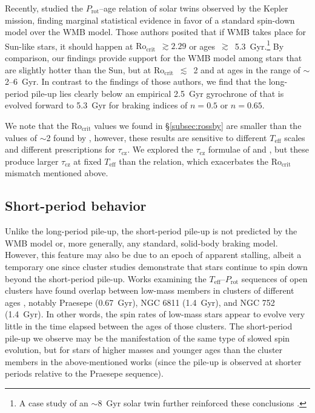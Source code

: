 \documentclass[trackchanges,twocolumn]{aastex631}
\newcommand{\taucz}{$\tau_\mathrm{cz}$\xspace}
\newcommand{\rocrit}{$\mathrm{Ro_{crit}}$\xspace}
\newcommand{\teff}{\ensuremath{T_{\mathrm{eff}}}\xspace}
\newcommand{\prot}{\ensuremath{P_\mathrm{rot}}\xspace}
\begin{document}
Recently, \citet{LorenzoOliveira2019} studied the \prot--age relation of solar twins observed by the Kepler mission, finding marginal statistical evidence in favor of a standard spin-down model over the WMB model. Those authors posited that if WMB takes place for Sun-like stars, it should happen at \rocrit~$\gtrsim 2.29$ or ages~$\gtrsim$~5.3~Gyr.\footnote{A case study of an $\sim$8~Gyr solar twin further reinforced these conclusions \citep{LorenzoOliveira2020}.} By comparison, our findings provide support for the WMB model among stars that are slightly hotter than the Sun, but at \rocrit~$\lesssim$~2 and at ages in the range of $\sim$2--6~Gyr. In contrast to the findings of those authors, we find that the long-period pile-up lies clearly below an empirical 2.5~Gyr gyrochrone of \citet{Curtis2020} that is evolved forward to 5.3~Gyr for braking indices of $n=0.5$ or $n=0.65$. 

We note that the \rocrit values we found in \S\ref{subsec:rossby} are smaller than the values of $\sim$2 found by \citet{vanSaders2016,vanSaders2019}, however, these results are sensitive to different \teff scales and different prescriptions for \taucz. We explored the \taucz formulae of \citet{BarnesKim2010} and \citet{Landin2010}, but these produce larger \taucz at fixed \teff than the \citet{Gunn1998} relation, which exacerbates the \rocrit mismatch mentioned above.


\subsection{Short-period behavior} \label{subsec:shortperiod}

Unlike the long-period pile-up, the short-period pile-up is not predicted by the WMB model or, more generally, any standard, solid-body braking model. However, this feature may also be due to an epoch of apparent stalling, albeit a temporary one since cluster studies demonstrate that stars continue to spin down beyond the short-period pile-up. Works examining the \teff–\prot sequences of open clusters have found overlap between low-mass members in clusters of different ages \citep{Agueros2018, Curtis2019a, Curtis2020}, notably Praesepe (0.67~Gyr), NGC 6811 (1.4~Gyr), and NGC 752 (1.4~Gyr). In other words, the spin rates of low-mass stars appear to evolve very little in the time elapsed between the ages of those clusters. The short-period pile-up we observe may be the manifestation of the same type of slowed spin evolution, but for stars of higher masses and younger ages than the cluster members in the above-mentioned works (since the pile-up is observed at shorter periods relative to the Praesepe sequence). 
\end{document}
